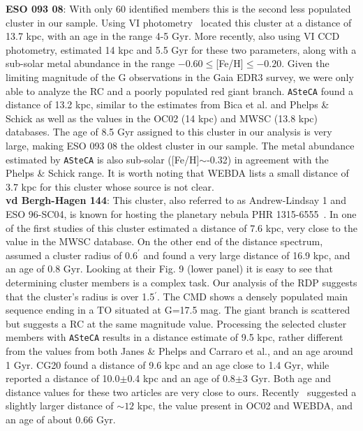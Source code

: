 \documentclass[draft]{aa}
\begin{document}
  \textbf{ESO 093 08}: With only 60 identified members this is the second less
  populated cluster in our sample. Using VI photometry~\cite{Bica_1999} located
  this cluster at a distance of 13.7 kpc, with an age in the range 4-5 Gyr.
  More recently, also using VI CCD photometry, \cite{Phelps_2003} estimated 14
  kpc and 5.5 Gyr for these two parameters, along with a sub-solar metal
  abundance in the range $-0.60\leq$[Fe/H]$\leq-0.20$.
  Given the limiting magnitude of the G observations in the Gaia EDR3 survey, we
  were only able to analyze the RC and a poorly populated red giant branch.
  \texttt{ASteCA} found a distance of 13.2 kpc, similar to the estimates from
  Bica et al. and Phelps \& Schick as well as the values in the OC02 (14 kpc)
  and MWSC (13.8 kpc) databases.
  The age of 8.5 Gyr assigned to this cluster in our analysis is very
  large, making ESO 093 08 the oldest cluster in our sample. The metal
  abundance estimated by \texttt{ASteCA} is also sub-solar ([Fe/H]$\sim$-0.32)
  in agreement with the Phelps \& Schick range. It is worth noting that WEBDA
  lists a small distance of 3.7 kpc for this cluster whose source is not
  clear.\\

  \textbf{vd Bergh-Hagen 144}: This cluster, also referred to as Andrew-Lindsay
  1 and ESO 96-SC04, is known for hosting the planetary nebula PHR
  1315-6555~\citep{Parker_2011}.
  In one of the first studies of this cluster\cite{Janes_1994} estimated a
  distance of 7.6 kpc, very close to the value in the MWSC database. On the
  other end of the distance spectrum,
  \cite{Carraro_2005_neglected} assumed a cluster radius of $0.6^{\prime}$ and
  found a very large distance of 16.9 kpc, and an age of 0.8 Gyr. Looking at
  their Fig. 9 (lower panel) it is easy to see that determining cluster members
  is a complex task. Our analysis of the RDP suggests that the cluster's radius
  is over 1.5$^{\prime}$. The CMD shows a densely populated main sequence ending
  in a TO situated at G=17.5 mag. The giant branch is scattered but suggests a
  RC at the same magnitude value.
  Processing the selected cluster members with \texttt{ASteCA} results in a
  distance estimate of 9.5 kpc, rather different from the values
  from both Janes \& Phelps and Carraro et al., and an age around 1 Gyr.
  CG20 found a distance of 9.6 kpc and an age close to 1.4 Gyr,
  while~\cite{Majaess_2014} reported a distance of 10.0$\pm$0.4 kpc and an
  age of 0.8$\pm$3 Gyr. Both age and distance values for these two articles are
  very close to ours. Recently~\cite{Fragkou_2019} suggested a slightly larger
  distance of $\sim12$ kpc, the value present in OC02 and WEBDA, and an age of
  about 0.66 Gyr.\\
\end{document}
